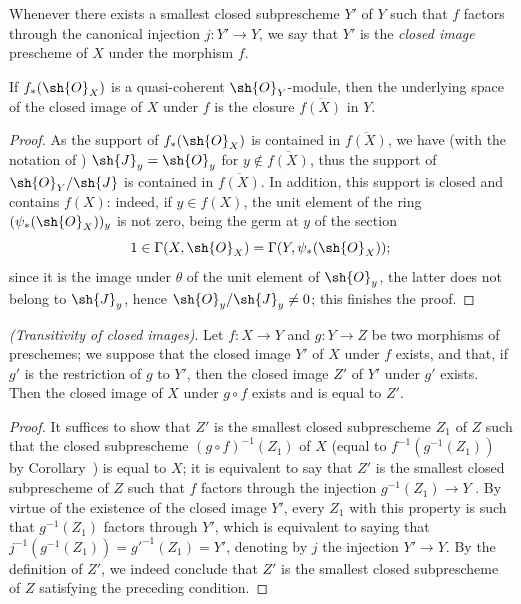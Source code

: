 \begin{definition}[9.5.3]
\label{I.9.5.3}
Whenever there exists a smallest closed subprescheme $Y'$ of $Y$ such that $f$ factors
through the canonical injection $j:Y'\to Y$, we say that $Y'$ is the
\emph{closed image} prescheme of $X$ under the morphism $f$.
\end{definition}

\begin{proposition}[9.5.4]
\label{I.9.5.4}
If $f_*(\sh{O}_X)$ is a quasi-coherent $\sh{O}_Y$-module, then the underlying space of
the closed image of $X$ under $f$ is the closure $\overline{f(X)}$ in $Y$.
\end{proposition}

\begin{proof}
As the support of $f_*(\sh{O}_X)$ is contained in $\overline{f(X)}$, we have (with
the notation of ) $\sh{J}_y=\sh{O}_y$ for
$y\not\in\overline{f(X)}$, thus the support of $\sh{O}_Y/\sh{J}$ is contained in
$\overline{f(X)}$. In addition, this support is closed and contains $f(X)$:
indeed, if $y\in f(X)$, the unit element of the ring $(\psi_*(\sh{O}_X))_y$ is not
zero, being the germ at $y$ of the section
\[
  1\in\Gamma(X,\sh{O}_X)=\Gamma(Y,\psi_*(\sh{O}_X));
\]
since it is the image under $\theta$ of the unit element of $\sh{O}_y$, the latter
does not belong to $\sh{J}_y$, hence $\sh{O}_y/\sh{J}_y\neq 0$; this finishes the
proof.
\end{proof}

\begin{proposition}[9.5.5]
\label{I.9.5.5}
\emph{(Transitivity of closed images)}. Let $f:X\to Y$ and $g:Y\to Z$ be two morphisms of
preschemes; we suppose that the closed image $Y'$ of $X$ under $f$ exists, and that, if $g'$
is the restriction of $g$ to $Y'$, then the closed image $Z'$ of $Y'$ under $g'$ exists. Then
the closed image of $X$ under $g\circ f$ exists and is equal to $Z'$.
\end{proposition}

\begin{proof}
It suffices  to show that $Z'$ is the smallest closed
subprescheme $Z_1$ of $Z$ such that the closed subprescheme $(g\circ f)^{-1}(Z_1)$ of $X$
(equal to $f^{-1}(g^{-1}(Z_1))$ by Corollary~) is equal to
$X$; it is equivalent to say that $Z'$ is the smallest closed subprescheme of $Z$ such that
$f$ factors through the injection $g^{-1}(Z_1)\to Y$ . By
virtue of the existence of the closed image $Y'$, every $Z_1$ with this property is such
that $g^{-1}(Z_1)$ factors through $Y'$, which is equivalent to saying that $j^{-1}(g^{-1}(Z_1))=g'^{-1}(Z_1)=Y'$, denoting by $j$ the injection $Y'\to Y$.
By the definition of $Z'$, we indeed conclude that $Z'$ is the smallest closed
subprescheme of $Z$ satisfying the preceding condition.
\end{proof}

